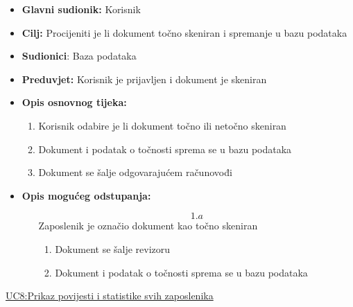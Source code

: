 \documentclass{article} %
\begin{document}
\begin{itemize}
	\item \textbf{Glavni sudionik:} Korisnik
	
	
	\item \textbf{Cilj:} Procijeniti je li dokument točno skeniran i spremanje u bazu podataka
	
	
	\item \textbf{Sudionici}: Baza podataka
	
	
	\item \textbf{Preduvjet:} Korisnik je prijavljen i dokument je skeniran
	
	
	\item \textbf{Opis osnovnog tijeka:} 
	\begin{enumerate}
		\item Korisnik odabire je li dokument točno ili netočno skeniran
		
		
		\item Dokument i podatak o točnosti sprema se u bazu podataka
		
		
		\item Dokument se šalje odgovarajućem računovođi
		
	\end{enumerate}
	\item \textbf{Opis mogućeg odstupanja:}
	
	\begin{enumerate}
		\item[$$1.a$$] Zaposlenik je označio dokument kao točno skeniran
		
		\begin{enumerate}[label=\arabic*.]
			\item Dokument se šalje revizoru
			
			\item Dokument i podatak o točnosti sprema se u bazu podataka
			
		\end{enumerate}
	\end{enumerate}
\end{itemize}



\noindent\underline{UC8:Prikaz povijesti i statistike svih zaposlenika}
\end{document}
